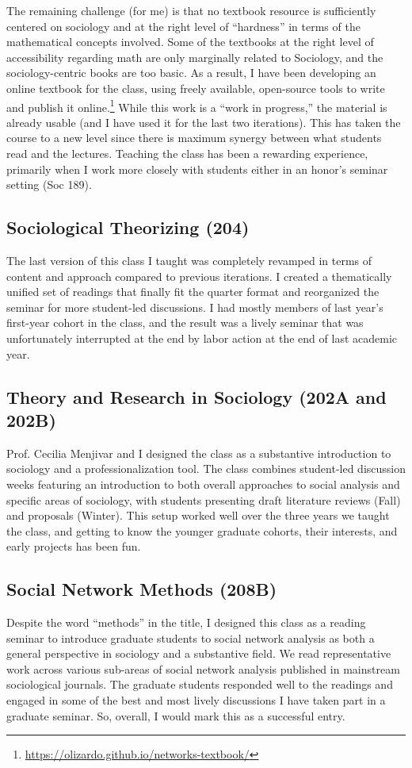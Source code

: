 \documentclass[a4paper,11pt]{extarticle}
\begin{document}
The remaining challenge (for me) is that no textbook resource is sufficiently centered on sociology and at the right level of ``hardness'' in terms of the mathematical concepts involved. Some of the textbooks at the right level of accessibility regarding math are only marginally related to Sociology, and the sociology-centric books are too basic. As a result, I have been developing an online textbook for the class, using freely available, open-source tools to write and publish it online.\footnote{\href{https://olizardo.github.io/networks-textbook/}{https://olizardo.github.io/networks-textbook/}} While this work is a ``work in progress,'' the material is already usable (and I have used it for the last two iterations). This has taken the course to a new level since there is maximum synergy between what students read and the lectures. Teaching the class has been a rewarding experience, primarily when I work more closely with students either in an honor's seminar setting (Soc 189).

\subsection*{Sociological Theorizing (204)}
The last version of this class I taught was completely revamped in terms of content and approach compared to previous iterations. I created a thematically unified set of readings that finally fit the quarter format and reorganized the seminar for more student-led discussions. I had mostly members of last year's first-year cohort in the class, and the result was a lively seminar that was unfortunately interrupted at the end by labor action at the end of last academic year. 

\subsection*{Theory and Research in Sociology (202A and 202B)}
Prof. Cecilia Menjivar and I designed the class as a substantive introduction to sociology and a professionalization tool. The class combines student-led discussion weeks featuring an introduction to both overall approaches to social analysis and specific areas of sociology, with students presenting draft literature reviews (Fall) and proposals (Winter). This setup worked well over the three years we taught the class, and getting to know the younger graduate cohorts, their interests, and early projects has been fun. 

\subsection*{Social Network Methods (208B)}
Despite the word ``methods'' in the title, I designed this class as a reading seminar to introduce graduate students to social network analysis as both a general perspective in sociology and a substantive field. We read representative work across various sub-areas of social network analysis published in mainstream sociological journals. The graduate students responded well to the readings and engaged in some of the best and most lively discussions I have taken part in a graduate seminar. So, overall, I would mark this as a successful entry.
\end{document}
